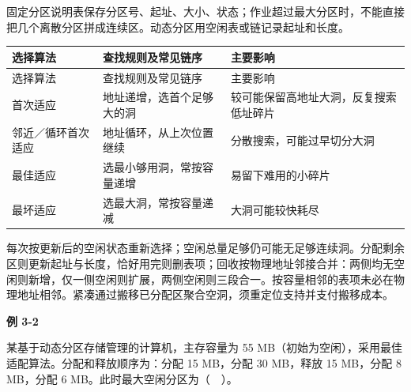 固定分区说明表保存分区号、起址、大小、状态；作业超过最大分区时，不能直接把几个离散分区拼成连续区。动态分区用空闲表或链记录起址和长度。

\par\smallskip
\begin{wideblock}
{\fontsize{9.3}{12}\selectfont\setlength{\tabcolsep}{2.5pt}\setlength{\LTleft}{0pt}\setlength{\LTright}{0pt}
\begin{longtable}{@{}>{\raggedright\arraybackslash}p{}>{\raggedright\arraybackslash}p{}>{\raggedright\arraybackslash}p{}@{}}
\toprule
选择算法 & 查找规则及常见链序 & 主要影响 \\

\midrule\endfirsthead\toprule
选择算法 & 查找规则及常见链序 & 主要影响 \\

\midrule\endhead\bottomrule\endfoot
首次适应 & 地址递增，选首个足够大的洞 & 较可能保留高地址大洞，反复搜索低址碎片 \\

邻近／循环首次适应 & 地址循环，从上次位置继续 & 分散搜索，可能过早切分大洞 \\

最佳适应 & 选最小够用洞，常按容量递增 & 易留下难用的小碎片 \\

最坏适应 & 选最大洞，常按容量递减 & 大洞可能较快耗尽 \\

\end{longtable}}
\end{wideblock}
\par\smallskip

每次按更新后的空闲状态重新选择；空闲总量足够仍可能无足够连续洞。分配剩余区则更新起址与长度，恰好用完则删表项；回收按物理地址邻接合并：两侧均无空闲则新增，仅一侧空闲则扩展，两侧空闲则三段合一。按容量相邻的表项未必在物理地址相邻。紧凑通过搬移已分配区聚合空洞，须重定位支持并支付搬移成本。

\par\medskip{}\noindent\hypertarget{OS03-E02}{}\label{OS03-E02}\textbf{例 3-2}\par\nobreak\smallskip

某基于动态分区存储管理的计算机，主存容量为 55 MB（初始为空闲），采用最佳适配算法。分配和释放顺序为：分配 15 MB，分配 30 MB，释放 15 MB，分配 8 MB，分配 6 MB。此时最大空闲分区为（　）。


